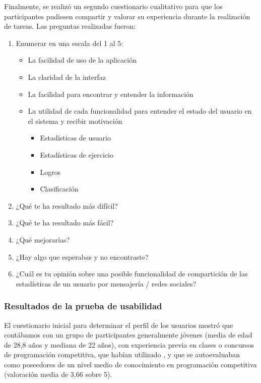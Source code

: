 Finalmente, se realizó un segundo cuestionario cualitativo para que los participantes pudiesen compartir y valorar su experiencia durante la realización de tareas. Las preguntas realizadas fueron:
\begin{enumerate}
    \item Enumerar en una escala del 1 al 5:
    \begin{itemize}
        \item La facilidad de uso de la aplicación
        \item La claridad de la interfaz
        \item La facilidad para encontrar y entender la información
        \item La utilidad de cada funcionalidad para entender el estado del usuario en el sistema y recibir motivación
        \begin{itemize}
            \item Estadísticas de usuario
            \item Estadísticas de ejercicio
            \item Logros
            \item Clasificación
        \end{itemize}
    \end{itemize}
    \item ¿Qué te ha resultado más difícil?
    \item ¿Qué te ha resultado más fácil?
    \item ¿Qué mejorarías?
    \item ¿Hay algo que esperabas y no encontraste?
    \item ¿Cuál es tu opinión sobre una posible funcionalidad de compartición de las estadísticas de un usuario por mensajería / redes sociales?
\end{enumerate}

\subsubsection{Resultados de la prueba de usabilidad}

El cuestionario inicial para determinar el perfil de los usuarios mostró que contábamos con un grupo de participantes generalmente jóvenes (media de edad de 28,8 años y mediana de 22 años), con experiencia previa en clases o concursos de programación competitiva, que habían utilizado \aer, y que se autoevaluaban como poseedores de un nivel medio de conocimiento en programación competitiva (valoración media de 3,66 sobre 5).

